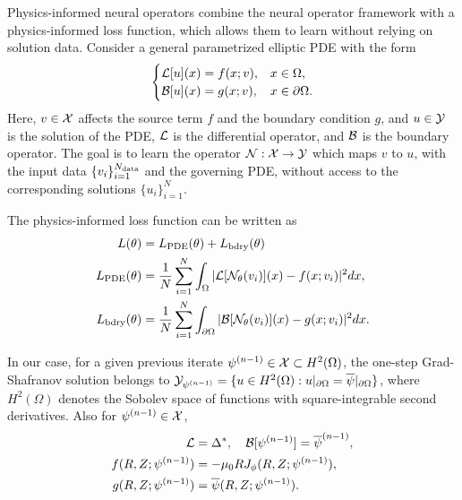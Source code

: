 Physics-informed neural operators \cite{PIDeepONet,PIFNO} combine 
the neural operator framework with a physics-informed loss function, 
which allows them to learn without relying on solution data. 
Consider a general parametrized elliptic PDE with the form 
\begin{align}\label{eq:6}
  \begin{cases}
    \cal{L}[u](x) = f(x;v), & x \in \Omega, \\
    \cal{B}[u](x) = g(x;v), & x \in \partial \Omega.
  \end{cases}
\end{align}
Here, $v \in \cal{X}$ affects the source term $f$ and the boundary condition $g$, and 
$u \in \cal{Y}$ is the solution of the PDE, $\cal{L}$ is the differential operator, and
$\cal{B}$ is the boundary operator.
The goal is to learn the operator $\cal{N}: \cal{X} \to \cal{Y}$ which maps
$v$ to $u$, with the input data $\{ v_i \}_{i=1}^{N_\te{data}}$ and the governing PDE, 
without access to the corresponding solutions $\{u_i\}_{i=1}^N$.

The physics-informed loss function can be written as
\begin{align}\label{eq:7}
  \begin{aligned}
    L(\theta) &= L_\te{PDE}(\theta) + L_\te{bdry}(\theta) \\
    L_\te{PDE}(\theta) &= \frac{1}{N}\sum_{i=1}^N \int_\Omega |\cal{L}[\cal{N}_\theta(v_i)](x) - f(x;v_i)|^2 dx, \\
    L_\te{bdry}(\theta) &= \frac{1}{N}\sum_{i=1}^N \int_{\partial \Omega} |\cal{B}[\cal{N}_\theta(v_i)](x) - g(x;v_i)|^2 dx.
  \end{aligned}
\end{align}

In our case, for a given previous iterate $\psi^{(n-1)}\in \cal{X} \subset H^2(\Omega)$, 
the one-step Grad-Shafranov solution belongs to 
$\cal{Y}_{\psi^{(n-1)}} = \{ u \in H^2(\Omega) : 
u|_{\partial \Omega} = \overline{\psi}|_{\partial \Omega} \}$,
where $H^2(\Omega)$ denotes the Sobolev space of functions with 
square-integrable second derivatives. 
Also for $\psi^{(n-1)} \in \cal{X}$,
\begin{align*}
  \cal{L} &= \Delta^*, \quad \cal{B}[\psi^{(n-1)}] = \overline{\psi}^{(n-1)},  \\
  f(R, Z; \psi^{(n-1)}) &= -\mu_0 R J_\phi (R, Z; \psi^{(n-1)}),  \\
  g(R, Z; \psi^{(n-1)}) &= \overline{\psi}(R, Z; \psi^{(n-1)}).
\end{align*} 

